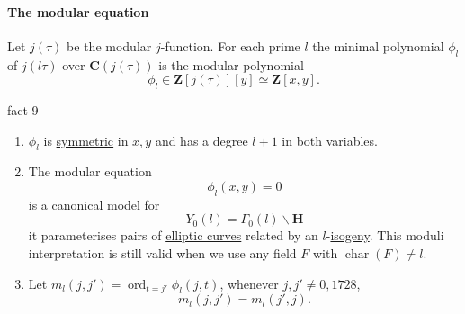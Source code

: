 \documentclass[10pt,]{book}
\numberwithin{equation}{section}
\newcommand{\ZZ}{\mathbf{Z}}
\newcommand{\CC}{\mathbf{C}}
\newcommand{\HH}{\mathbf{H}}
\DeclareMathOperator{\characteristic}{char}
\DeclareMathOperator{\ord}{ord}
\begin{document}
\paragraph[{The modular equation}]{The modular equation}\hypertarget{paragraphs-22}{}
\hypertarget{p-794}{}%
Let \(j(\tau)\) be the modular \(j\)-function. For each prime \(l\) the minimal polynomial \(\phi_l\) of \(j(l\tau)\) over \(\CC (j(\tau))\) is the modular polynomial%
\begin{equation*}
\phi_l \in \ZZ[j(\tau)][y] \simeq \ZZ[x,y]\text{.}
\end{equation*}
%
\begin{fact}{}{}{fact-9}%
\hypertarget{p-795}{}%
\leavevmode%
\begin{enumerate}
\item\hypertarget{li-189}{}\(\phi_l\) is \hyperref[def-princ-pol]{symmetric} in \(x,y\) and has a degree \(l+1\) in both variables.%
\item\hypertarget{li-190}{}The modular equation%
\begin{equation*}
\phi_l (x,y) = 0
\end{equation*}
is a canonical model for%
\begin{equation*}
Y_0(l) = \Gamma_0(l) \backslash \HH
\end{equation*}
it parameterises pairs of \hyperref[def-supersing-isog-ec]{elliptic curves} related by an \(l\)-\hyperref[def-supersing-isog-isog]{isogeny}. This moduli interpretation is still valid when we use any field \(F\) with \(\characteristic(F) \ne l\).%
\item\hypertarget{li-191}{}Let \(m_l(j,j') = \ord_{t = j'} \phi_l(j,t)\), whenever \(j,j' \ne 0,1728\),%
\begin{equation*}
m_l(j,j') = m_l(j',j)\text{.}
\end{equation*}
%
\end{enumerate}
%
\end{fact}
%
%
\typeout{************************************************}
\typeout{************************************************}
%
\end{document}
